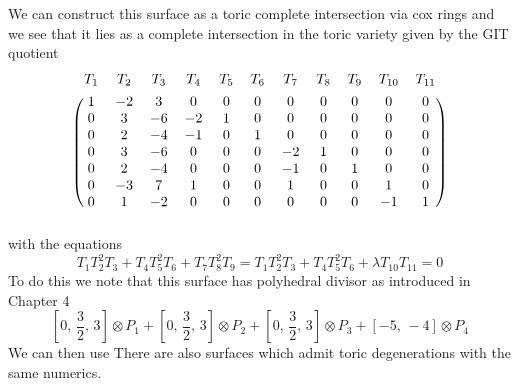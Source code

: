 \documentclass[12pt]{amsbook}
\theoremstyle{plain}
\begin{document}
We can construct this surface as a toric complete intersection via cox rings \cite{HausenCoxRings} and we see that it lies as a complete intersection in the toric variety given by the GIT quotient
\[
\begin{blockarray}{cc cc cc cc cc c}
	T_1 & T_2 & T_3 & T_4 & T_5 & T_6 & T_7 & T_8 & T_9 & T_{10} & T_{11} \\[4pt]
      \begin{block}{(cc cc cc cc cc c)}
	1&-2&3&0&0&0&0&0&0&0&0 \\ 
	0&3&-6&-2&1&0&0&0&0&0&0 \\
	0&2&-4&-1&0&1&0&0&0&0&0 \\
	0&3&-6&0&0&0&-2&1&0&0&0 \\ 
	0&2&-4&0&0&0&-1&0&1&0&0 \\
	0&-3&7&1&0&0&1&0&0&1&0 \\
	0&1&-2&0&0&0&0&0&0&-1&1 \\
      \end{block}
\end{blockarray}
\]
with the equations 
\[
T_1 T_2^2 T_3 + T_4 T_5^2 T_6 + T_7 T_8^2 T_9 = 
T_1 T_2^2 T_3 + T_4 T_5^2 T_6  + \lambda T_{10} T_{11} = 0
\]
To do this we note that this surface has polyhedral divisor as introduced in Chapter 4
\[ 
\left[ 0, \, \frac{3}{2}, \, 3 \right] \otimes P_1 + \left[ 0, \, \frac{3}{2}, \, 3 \right] \otimes P_2 + \left[ 0, \, \frac{3}{2}, \, 3 \right] \otimes P_3 + \left[ -5, \, -4 \right] \otimes P_4
\]
We can then use 
There are also surfaces which admit toric degenerations with the same numerics.
\end{document}
